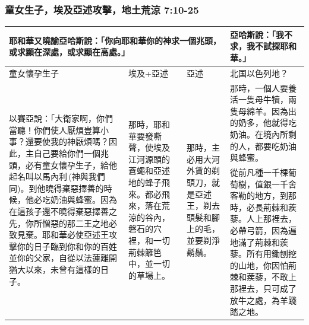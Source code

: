 \subsubsection{童女生子，埃及亞述攻擊，地土荒涼 7:10-25}
\begin{table}[H]
\centering 
\begin{tabularx}{15cm}{p{6.05cm}|p{2.25cm}|p{1.45cm}|p{5.25cm}}\hline
\multicolumn{3}{X|}{耶和華又曉諭亞哈斯說：「你向耶和華你的神求一個兆頭，或求顯在深處，或求顯在高處。」}&亞哈斯說：「我不求，我不試探耶和華。」\\\hline
童女懷孕生子&埃及+亞述&亞述&北国以色列地？\\\hline
\multirow{2}{6.16cm}{以賽亞說：「大衛家啊，你們當聽！你們使人厭煩豈算小事？還要使我的神厭煩嗎？因此，主自己要給你們一個兆頭，必有童女懷孕生子，給他起名叫以馬內利 (神與我們同)。到他曉得棄惡擇善的時候，他必吃奶油與蜂蜜。因為在這孩子還不曉得棄惡擇善之先，你所憎惡的那二王之地必致見棄。耶和華必使亞述王攻擊你的日子臨到你和你的百姓並你的父家，自從以法蓮離開猶大以來，未曾有這樣的日子。} 
&\multirow{2}{2.3cm}{那時，耶和華要發嘶聲，使埃及江河源頭的蒼蠅和亞述地的蜂子飛來。都必飛來，落在荒涼的谷內，磐石的穴裡，和一切荊棘籬笆中，並一切的草場上。} 
&\multirow{2}{1.5cm}{那時，主必用大河外賃的剃頭刀，就是亞述王，剃去頭髮和腳上的毛，並要剃淨鬍鬚。} 
&那時，一個人要養活一隻母牛犢，兩隻母綿羊。因為出的奶多，他就得吃奶油。在境內所剩的人，都要吃奶油與蜂蜜。\\\cline{4-4}
&&&從前凡種一千棵葡萄樹，值銀一千舍客勒的地方，到那時，必長荊棘和蒺藜。人上那裡去，必帶弓箭，因為遍地滿了荊棘和蒺藜。所有用鋤刨挖的山地，你因怕荊棘和蒺藜，不敢上那裡去，只可成了放牛之處，為羊踐踏之地。\\\hline
\end{tabularx}
\end{table}

